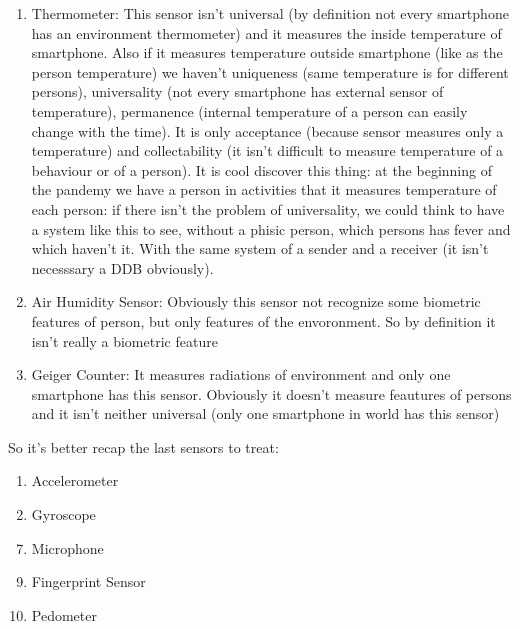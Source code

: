 \documentclass[12pt]{article}
\begin{document}
\begin{enumerate}
    \item Thermometer: This sensor isn't universal (by definition not every smartphone has an environment thermometer) and it measures the inside temperature of smartphone. Also if it measures temperature outside smartphone (like as the person temperature) we haven't uniqueness (same temperature is for different persons), universality (not every smartphone has external sensor of temperature), permanence (internal temperature of a person can easily change with the time). It is only acceptance (because sensor measures only a temperature) and collectability (it isn't difficult to measure temperature of a behaviour or of a person). It is cool discover this thing: at the beginning of the pandemy we have a person in activities that it measures temperature of each person: if there isn't the problem of universality, we could think to have a system like this to see, without a phisic person, which persons has fever and which haven't it. With the same system of a sender and a receiver (it isn't necesssary a DDB obviously).

    \item Air Humidity Sensor: Obviously this sensor not recognize some biometric features of person, but only features of the envoronment. So by definition it isn't really a biometric feature

    \item Geiger Counter: It measures radiations of environment and only one smartphone has this sensor. Obviously it doesn't measure feautures of persons and it isn't neither universal (only one smartphone in world has this sensor)

\end{enumerate}

So it's better recap the last sensors to treat:

\begin{enumerate}
    \item Accelerometer

    \item Gyroscope

\end{enumerate}
    
\begin{enumerate}
  \setcounter{enumi}{6}
  \item Microphone

\end{enumerate}

\begin{enumerate}
  \setcounter{enumi}{8}
  \item Fingerprint Sensor
  \item Pedometer

\end{enumerate}
\end{document}
